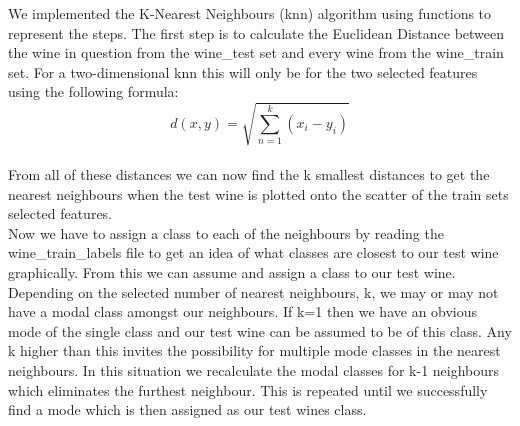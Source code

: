 \documentclass[10pt]{article}
\begin{document}
We implemented the K-Nearest Neighbours (knn) algorithm using functions to represent the steps. The first step is to calculate the Euclidean Distance between the wine in question from the wine\_test set and every wine from the wine\_train set. For a two-dimensional knn this will only be for the two selected features using the following formula:
$$d(x,y) = \sqrt{\sum_{n=1}^{k} (x_i - y_i)}$$
\\
\noindent
From all of these distances we can now find the k smallest distances to get the nearest neighbours when the test wine is plotted onto the scatter of the train sets selected features.\\

\noindent
Now we have to assign a class to each of the neighbours by reading the wine\_train\_labels file to get an idea of what classes are closest to our test wine graphically. From this we can assume and assign a class to our test wine. Depending on the selected number of nearest neighbours, k, we may or may not have a modal class amongst our neighbours. If k=1 then we have an obvious mode of the single class and our test wine can be assumed to be of this class. Any k higher than this invites the possibility for multiple mode classes in the nearest neighbours. In this situation we recalculate the modal classes for k-1 neighbours which eliminates the furthest neighbour. This is repeated until we successfully find a mode which is then assigned as our test wines class.\\
\end{document}
